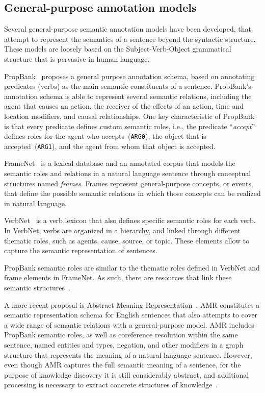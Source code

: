   \subsection{General-purpose annotation models}\label{sec:general}

  Several general-purpose semantic annotation models have been developed, that attempt to represent the semantics of a sentence beyond the syntactic structure.
  These models are loosely based on the Subject-Verb-Object grammatical structure that is pervasive in human language.

  PropBank~\cite{propbank} proposes a general purpose annotation schema, based on annotating predicates (verbs) as the main semantic constituents of a sentence. ProbBank's annotation schema is able to represent several semantic relations, including the agent that causes an action, the receiver of the effects of an action, time and location modifiers, and causal relationships.
  One key characteristic of PropBank is that every predicate defines custom semantic roles, i.e., the predicate ``\textit{accept}'' defines roles for the agent who accepts~(\texttt{ARG0}), the object that is accepted~(\texttt{ARG1}), and the agent from whom that object is accepted.

  FrameNet~\cite{framenet} is a lexical database and an annotated corpus that models the semantic roles and relations in a natural language sentence through conceptual structures named \textit{frames}. Frames represent general-purpose concepts, or events, that define the possible semantic relations in which those concepts can be realized in natural language.

  VerbNet~\cite{verbnet} is a verb lexicon that also defines specific semantic roles for each verb. In VerbNet, verbs are organized in a hierarchy, and linked through different thematic roles, such as agents, cause, source, or topic. These elements allow to capture the semantic representation of sentences.

  PropBank semantic roles are similar to the thematic roles defined in VerbNet and frame elements in FrameNet. As such, there are resources that link these semantic structures~\cite{semlink}.

  A more recent proposal is Abstract Meaning Representation~\cite[ARM]{amr}. AMR constitutes a semantic representation schema for English sentences that also attempts to cover a wide range of semantic relations with a general-purpose model.
  AMR includes PropBank semantic roles, as well as coreference resolution within the same sentence, named entities and types, negation, and other modifiers in a graph structure that represents the meaning of a natural language sentence.
  However, even though AMR captures the full semantic meaning of a sentence, for the purpose of knowledge discovery it is still considerably abstract, and additional processing is necessary to extract concrete structures of knowledge~\cite{rao2017biomedical}.

